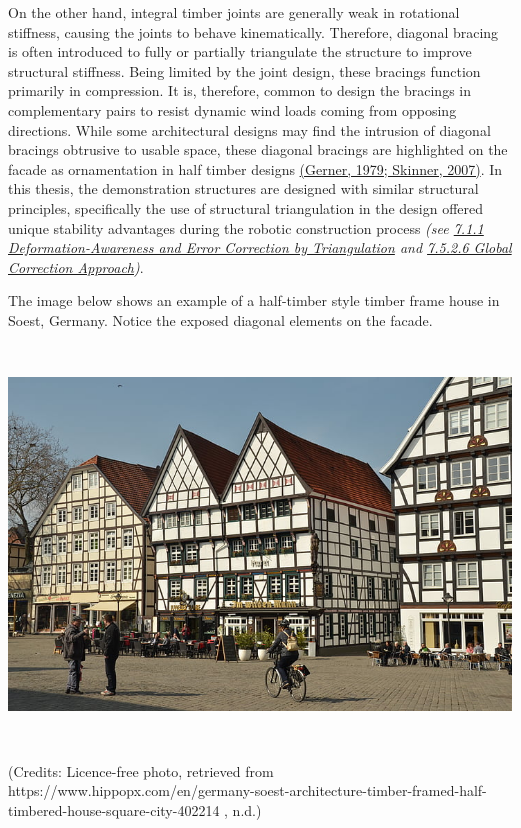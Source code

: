 \documentclass[11pt]{book}
\begin{document}
On the other hand, integral timber joints are generally weak in rotational stiffness, causing the joints to behave kinematically. Therefore, diagonal bracing is often introduced to fully or partially triangulate the structure to improve structural stiffness. Being limited by the joint design, these bracings function primarily in compression. It is, therefore, common to design the bracings in complementary pairs to resist dynamic wind loads coming from opposing directions. While some architectural designs may find the intrusion of diagonal bracings obtrusive to usable space, these diagonal bracings are highlighted on the facade as ornamentation in half timber designs \href{https://www.zotero.org/google-docs/?NgmBHM}{(Gerner, 1979; Skinner, 2007)}. In this thesis, the demonstration structures are designed with similar structural principles, specifically the use of structural triangulation in the design offered unique stability advantages during the robotic construction process \textit{(see \underline{7.1.1 Deformation-Awareness and Error Correction by Triangulation} and \underline{7.5.2.6 Global Correction Approach})}.

The image below shows an example of a half-timber style timber frame house in Soest, Germany. Notice the exposed diagonal elements on the facade.

\includegraphics[width=15.92cm,height=10.55cm]{./images/image9.jpg}{\footnotesize (Credits: Licence-free photo, retrieved from https://www.hippopx.com/en/germany-soest-architecture-timber-framed-half-timbered-house-square-city-402214 , n.d.)\par}
\end{document}

